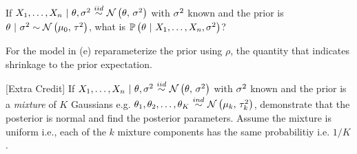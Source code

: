 \documentclass[12pt]{article}
\begin{document}
 If $\Xoneton ~|~\theta,\sigsq \iid \normnot{\theta}{\sigsq}$ with $\sigma^2$ known and the prior is $\theta ~|~\sigma^2 \sim \mathcal{N}\left(\mu_0,\,\tau^2\right)$, what is $\mathbb{P}\left(\theta~|~X_1, \ldots, X_n, \sigma^2\right)$? 

 For the model in (e) reparameterize the prior using $\rho$, the quantity that indicates shrinkage to the prior expectation. 

 [Extra Credit] If $\Xoneton ~|~\theta,\sigsq \iid \normnot{\theta}{\sigsq}$ with $\sigma^2$ known and the prior is a \textit{mixture} of $K$ Gaussians e.g. $\theta_1, \theta_2, \ldots, \theta_K \inddist \normnot{\mu_k}{\tau^2_k}$, demonstrate that the posterior is normal and find the posterior parameters. Assume the mixture is uniform i.e., each of the $k$ mixture components has the same probabilitiy i.e. $1/K$.

\eenum
\end{document}
